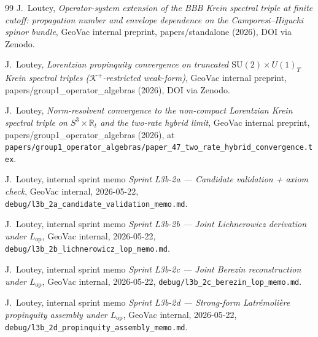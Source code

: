 \documentclass[11pt,a4paper]{article}
\theoremstyle{plain}
\theoremstyle{definition}
\newcommand{\sthree}{S^{3}}
\newcommand{\Krein}{\mathcal{K}}
\newcommand{\SU}{\mathrm{SU}}
\newcommand{\Uone}{U(1)}
\newcommand{\Kplus}{\Krein^{+}}
\begin{document}
\begin{thebibliography}{99}
J.~Loutey,
\newblock \emph{Operator-system extension of the BBB Krein spectral
triple at finite cutoff: propagation number and envelope dependence
on the Camporesi--Higuchi spinor bundle},
\newblock GeoVac internal preprint, papers/standalone (2026),
DOI via Zenodo.

J.~Loutey,
\newblock \emph{Lorentzian propinquity convergence on truncated
$\SU(2) \times \Uone_{T}$ Krein spectral triples ($\Kplus$-restricted
weak-form)},
\newblock GeoVac internal preprint, papers/group1\_operator\_algebras
(2026), DOI via Zenodo.

J.~Loutey,
\newblock \emph{Norm-resolvent convergence to the non-compact
Lorentzian Krein spectral triple on $\sthree \times \mathbb{R}_{t}$
and the two-rate hybrid limit},
\newblock GeoVac internal preprint, papers/group1\_operator\_algebras
(2026), at
\texttt{papers/group1\_operator\_algebras/paper\_47\_two\_rate\_hybrid\_convergence.tex}.

J.~Loutey, internal sprint memo
\emph{Sprint L3b-2a --- Candidate validation + axiom check},
GeoVac internal, 2026-05-22,
\texttt{debug/l3b\_2a\_candidate\_validation\_memo.md}.

J.~Loutey, internal sprint memo
\emph{Sprint L3b-2b --- Joint Lichnerowicz derivation under $L_{\mathrm{op}}$},
GeoVac internal, 2026-05-22,
\texttt{debug/l3b\_2b\_lichnerowicz\_lop\_memo.md}.

J.~Loutey, internal sprint memo
\emph{Sprint L3b-2c --- Joint Berezin reconstruction under $L_{\mathrm{op}}$},
GeoVac internal, 2026-05-22,
\texttt{debug/l3b\_2c\_berezin\_lop\_memo.md}.

J.~Loutey, internal sprint memo
\emph{Sprint L3b-2d --- Strong-form Latr\'emoli\`ere propinquity
assembly under $L_{\mathrm{op}}$},
GeoVac internal, 2026-05-22,
\texttt{debug/l3b\_2d\_propinquity\_assembly\_memo.md}.

\end{thebibliography}
\end{document}
